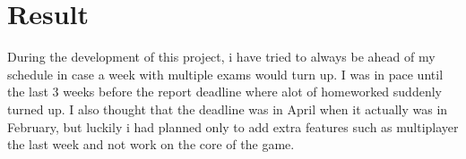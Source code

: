 \documentclass[a4paper,12pt]{article}
\begin{document}
\clearpage

\section{Result}

During the development of this project, i have tried to always be ahead of my schedule in case a week with multiple exams would turn up.
I was in pace until the last 3 weeks before the report deadline where alot of homeworked suddenly turned up.
I also thought that the deadline was in April when it actually was in February, but luckily i had planned only to add extra features such as multiplayer the last week and not work on the core of the game.

\clearpage
\end{document}
